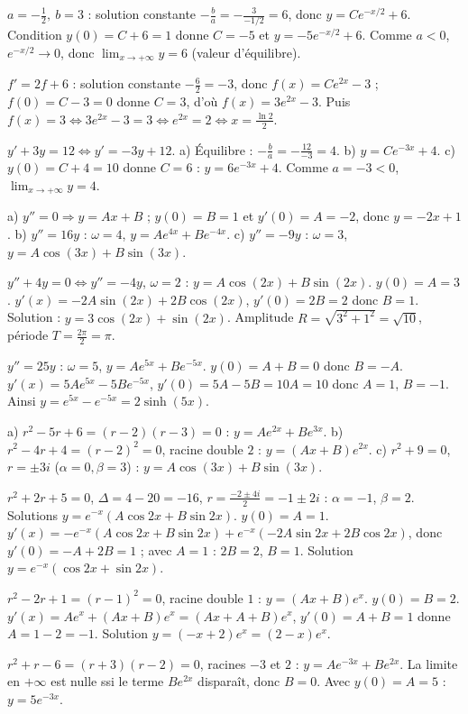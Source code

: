 $a=-\frac12,\ b=3$ : solution constante $-\frac{b}{a}=-\frac{3}{-1/2}=6$, donc
$y=Ce^{-x/2}+6$. Condition $y(0)=C+6=1$ donne $C=-5$ et $y=-5e^{-x/2}+6$.
Comme $a<0$, $e^{-x/2}\to0$, donc $\displaystyle\lim_{x\to+\infty}y=6$
(valeur d'équilibre).

$f'=2f+6$ : solution constante $-\frac{6}{2}=-3$, donc $f(x)=Ce^{2x}-3$ ;
$f(0)=C-3=0$ donne $C=3$, d'où $f(x)=3e^{2x}-3$.
Puis $f(x)=3 \Leftrightarrow 3e^{2x}-3=3 \Leftrightarrow e^{2x}=2
\Leftrightarrow x=\frac{\ln 2}{2}$.

$y'+3y=12 \Leftrightarrow y'=-3y+12$. a) Équilibre : $-\frac{b}{a}=-\frac{12}{-3}=4$.\;
b) $y=Ce^{-3x}+4$.\; c) $y(0)=C+4=10$ donne $C=6$ : $y=6e^{-3x}+4$. Comme $a=-3<0$,
$\displaystyle\lim_{x\to+\infty}y=4$.

a) $y''=0\Rightarrow y=Ax+B$ ; $y(0)=B=1$ et $y'(0)=A=-2$, donc $y=-2x+1$.\;
b) $y''=16y$ : $\omega=4$, $y=Ae^{4x}+Be^{-4x}$.\;
c) $y''=-9y$ : $\omega=3$, $y=A\cos(3x)+B\sin(3x)$.

$y''+4y=0\Leftrightarrow y''=-4y$, $\omega=2$ : $y=A\cos(2x)+B\sin(2x)$.
$y(0)=A=3$. $y'(x)=-2A\sin(2x)+2B\cos(2x)$, $y'(0)=2B=2$ donc $B=1$.
Solution : $y=3\cos(2x)+\sin(2x)$. Amplitude $R=\sqrt{3^2+1^2}=\sqrt{10}$,
période $T=\frac{2\pi}{2}=\pi$.

$y''=25y$ : $\omega=5$, $y=Ae^{5x}+Be^{-5x}$. $y(0)=A+B=0$ donc $B=-A$.
$y'(x)=5Ae^{5x}-5Be^{-5x}$, $y'(0)=5A-5B=10A=10$ donc $A=1$, $B=-1$.
Ainsi $y=e^{5x}-e^{-5x}=2\sinh(5x)$.

a) $r^2-5r+6=(r-2)(r-3)=0$ : $y=Ae^{2x}+Be^{3x}$.\;
b) $r^2-4r+4=(r-2)^2=0$, racine double $2$ : $y=(Ax+B)e^{2x}$.\;
c) $r^2+9=0$, $r=\pm 3i$ ($\alpha=0,\beta=3$) : $y=A\cos(3x)+B\sin(3x)$.

$r^2+2r+5=0$, $\Delta=4-20=-16$, $r=\frac{-2\pm4i}{2}=-1\pm2i$ : $\alpha=-1$,
$\beta=2$. Solutions $y=e^{-x}(A\cos2x+B\sin2x)$. $y(0)=A=1$.
$y'(x)=-e^{-x}(A\cos2x+B\sin2x)+e^{-x}(-2A\sin2x+2B\cos2x)$, donc
$y'(0)=-A+2B=1$ ; avec $A=1$ : $2B=2$, $B=1$. Solution
$y=e^{-x}(\cos2x+\sin2x)$.

$r^2-2r+1=(r-1)^2=0$, racine double $1$ : $y=(Ax+B)e^{x}$. $y(0)=B=2$.
$y'(x)=Ae^{x}+(Ax+B)e^{x}=(Ax+A+B)e^{x}$, $y'(0)=A+B=1$ donne $A=1-2=-1$.
Solution $y=(-x+2)e^{x}=(2-x)e^x$.

$r^2+r-6=(r+3)(r-2)=0$, racines $-3$ et $2$ : $y=Ae^{-3x}+Be^{2x}$. La limite en
$+\infty$ est nulle ssi le terme $Be^{2x}$ disparaît, donc $B=0$. Avec $y(0)=A=5$ :
$y=5e^{-3x}$.

